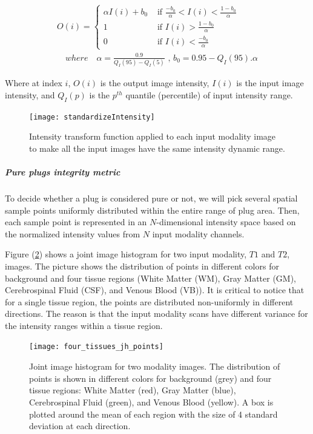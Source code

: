 \begin{equation}
\label{eq:standardizeIntensity}
\begin{gathered}
O(i) = \begin{cases}
\alpha I(i) + b_{0} & \text{ if   } \frac{-b_0}{\alpha} < I(i) < \frac{1-b_0}{\alpha} \\
1 & \text{ if } I(i) > \frac{1-b_0}{\alpha} \\
0  & \text{ if } I(i) < \frac{-b_0}{\alpha}
\end{cases} \\
\quad where \quad \alpha = \frac{0.9}{ Q_I(95) - Q_I(5) }
\text{  ,  } b_0 = 0.95 - Q_I(95) . \alpha
\end{gathered}
\end{equation}

Where at index $i$, $O(i)$ is the output image intensity, $I(i)$ is the input image intensity, and $Q_I(p)$ is the $p^{th}$ quantile (percentile) of input intensity range.

\begin{figure}
\centering
\texttt{[image: standardizeIntensity]}\
\centering
\caption{Intensity transform function applied to each input modality image to make all the input images have the same intensity dynamic range.}
\label{fig:standardizeIntensity}
\end{figure}

\subparagraph{Pure plugs integrity metric}

To decide whether a plug is considered pure or not, we will pick several spatial sample points uniformly distributed within the entire range of plug area. Then, each sample point is represented in an $N$-dimensional intensity space based on the normalized intensity values from $N$ input modality channels.

Figure (\ref{fig:four_tissues_jh_points}) shows a joint image histogram for two input modality, $T1$ and $T2$, images.
The picture shows the distribution of points in different colors for background and four tissue regions (White Matter (WM), Gray Matter (GM), Cerebrospinal Fluid (CSF), and Venous Blood (VB)).
It is critical to notice that for a single tissue region, the points are distributed non-uniformly in different directions. The reason is that the input modality scans have different variance for the intensity ranges within a tissue region.

\begin{figure}
\centering
\texttt{[image: four\_tissues\_jh\_points]}\
\centering
\caption{Joint image histogram for two modality images. The distribution of points is shown in different colors for background (grey) and four tissue regions: White Matter (red), Gray Matter (blue), Cerebrospinal Fluid (green), and Venous Blood (yellow). A box is plotted around the mean of each region with the size of 4 standard deviation at each direction.}
\label{fig:four_tissues_jh_points}
\end{figure}

